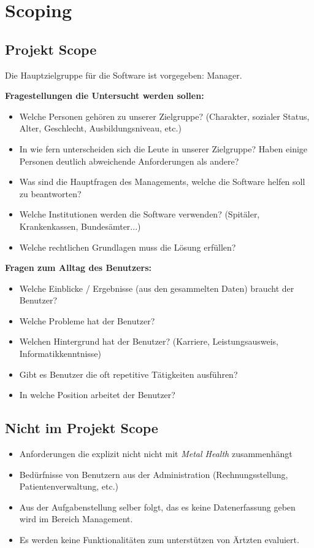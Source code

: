 \documentclass[a4paper]{scrreprt}
\begin{document}
\section{Scoping}

\subsection{Projekt Scope}
Die Hauptzielgruppe für die Software ist vorgegeben: Manager.

\bigskip


\textbf{Fragestellungen die Untersucht werden sollen:}
\begin{itemize}
\item Welche Personen gehören zu unserer Zielgruppe? (Charakter, sozialer Status, Alter, Geschlecht, Ausbildungsniveau, etc.)
\item In wie fern unterscheiden sich die Leute in unserer Zielgruppe? Haben einige Personen deutlich abweichende Anforderungen als andere?
\item Was sind die Hauptfragen des Managements, welche die Software helfen soll zu beantworten?
\item Welche Institutionen werden die Software verwenden? (Spitäler, Krankenkassen, Bundesämter...)
\item Welche rechtlichen Grundlagen muss die Lösung erfüllen?
\end{itemize}


\textbf{Fragen zum Alltag des Benutzers:}

\begin{itemize}
\item Welche Einblicke / Ergebnisse (aus den gesammelten Daten) braucht der Benutzer?
\item Welche Probleme hat der Benutzer?
\item Welchen Hintergrund hat der Benutzer? (Karriere, Leistungsausweis, Informatikkenntnisse)
\item Gibt es Benutzer die oft repetitive Tätigkeiten ausführen?
\item In welche Position arbeitet der Benutzer?
\end{itemize}

\subsection{Nicht im Projekt Scope}

\begin{itemize}
\item Anforderungen die explizit nicht nicht mit \textit{Metal Health} zusammenhängt
\item Bedürfnisse von Benutzern aus der Administration (Rechnungsstellung, Patientenverwaltung, etc.)
\item Aus der Aufgabenstellung selber folgt, das es keine Datenerfassung geben wird im Bereich Management.
\item Es werden keine Funktionalitäten zum unterstützen von Ärtzten evaluiert. 
\end{itemize} 
\end{document}
